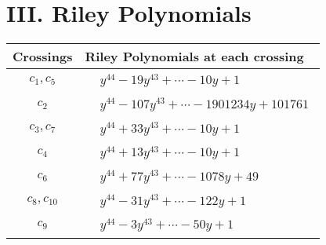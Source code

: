 \documentclass[1p]{elsarticle_modified}
\theoremstyle{definition}
\begin{document}
\centering \section*{ III. Riley Polynomials}
\begin{tabular}{m{50pt}|m{274pt}}
Crossings & \hspace{64pt}Riley Polynomials at each crossing \\
\hline $$\begin{aligned}c_{1},c_{5}\end{aligned}$$&$\begin{aligned}
&y^{44}-19 y^{43}+\cdots-10 y+1
\end{aligned}$\\
\hline $$\begin{aligned}c_{2}\end{aligned}$$&$\begin{aligned}
&y^{44}-107 y^{43}+\cdots-1901234 y+101761
\end{aligned}$\\
\hline $$\begin{aligned}c_{3},c_{7}\end{aligned}$$&$\begin{aligned}
&y^{44}+33 y^{43}+\cdots-10 y+1
\end{aligned}$\\
\hline $$\begin{aligned}c_{4}\end{aligned}$$&$\begin{aligned}
&y^{44}+13 y^{43}+\cdots-10 y+1
\end{aligned}$\\
\hline $$\begin{aligned}c_{6}\end{aligned}$$&$\begin{aligned}
&y^{44}+77 y^{43}+\cdots-1078 y+49
\end{aligned}$\\
\hline $$\begin{aligned}c_{8},c_{10}\end{aligned}$$&$\begin{aligned}
&y^{44}-31 y^{43}+\cdots-122 y+1
\end{aligned}$\\
\hline $$\begin{aligned}c_{9}\end{aligned}$$&$\begin{aligned}
&y^{44}-3 y^{43}+\cdots-50 y+1
\end{aligned}$\\
\hline
\end{tabular}
\vskip 2pc
\end{document}
